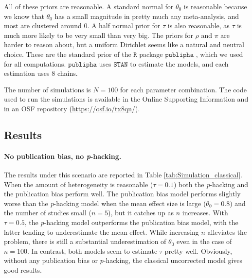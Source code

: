 \documentclass[useAMS,usenatbib,referee]{biom}
\begin{document}
All of these priors are reasonable. A standard normal for $\theta_0$ is reasonable because we know that $\theta_0$ has a small magnitude in pretty much any meta-analysis, and most are clustered around $0$. A half normal prior for $\tau$ is also reasonable, as $\tau$ is much more likely to be very small than very big. The priors for $\rho$ and $\pi$ are harder to reason about, but a uniform Dirichlet seems like a natural and neutral choice. These are the standard prior of the $\mathtt{R}$ package $\mathtt{publipha}$ \citep{publipha}, which we used for all computations. $\mathtt{publipha}$ uses $\mathtt{STAN}$ \citep{Carpenter2017-cf} to estimate the models, and each estimation uses $8$ chains.

The number of simulations is $N = 100$ for each parameter combination. The code used to run the simulations is available in the Online Supporting Information and in an OSF repository (\url{https://osf.io/tx8qn/}).

\subsection{Results}
\paragraph{No publication bias, no \textit{p}-hacking.} The results under this scenario are reported in Table \ref{tab:Simulation_classical}. When the amount of heterogeneity is reasonable ($\tau = 0.1$) both the \textit{p}-hacking and the publication bias perform well. The publication bias model performs slightly worse than the \textit{p}-hacking model when the mean effect size is large ($\theta_0 = 0.8$) and the number of studies small ($n=5$), but it catches up as $n$ increases. With $\tau = 0.5$, the \textit{p}-hacking model outperforms the publication bias model, with the latter tending to underestimate the mean effect. While increasing $n$ alleviates the problem, there is still a substantial underestimation of $\theta_0$ even in the case of $n = 100$. In contrast, both models seem to estimate $\tau$ pretty well. Obviously, without any publication bias or $p$-hacking, the classical uncorrected model gives good results.
\end{document}
